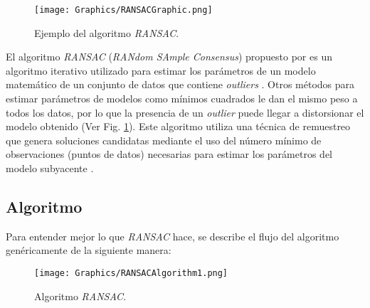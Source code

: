 \begin{figure}[b]
    \centering
    \texttt{[image: Graphics/RANSACGraphic.png]}
    \caption{Ejemplo del algoritmo \textit{RANSAC}.}
    \label{fig:RANSACExample}
\end{figure}

El algoritmo \textit{RANSAC} (\textit{RANdom SAmple Consensus}) propuesto por \cite{FischlerBolles} es un algoritmo iterativo utilizado para estimar los parámetros de un modelo matemático de un conjunto de datos que contiene \textit{outliers} \cite{PabloJuan}. Otros métodos para estimar parámetros de modelos como mínimos cuadrados le dan el mismo peso a todos los datos, por lo que la presencia de un \textit{outlier} puede llegar a distorsionar el modelo obtenido (Ver Fig. \ref{fig:RANSACExample}). Este algoritmo utiliza una técnica de remuestreo que genera soluciones candidatas mediante el uso del número mínimo de observaciones (puntos de datos) necesarias para estimar los parámetros del modelo subyacente \cite{Konstantinos}.

\subsection{Algoritmo}

Para entender mejor lo que \textit{RANSAC} hace, se describe el flujo del algoritmo genéricamente de la siguiente manera:

\begin{figure}[!h]
	\centering
	\texttt{[image: Graphics/RANSACAlgorithm1.png]}
	\caption{Algoritmo \textit{RANSAC}.}
	\label{fig:RANSACAlgorithm}
\end{figure}

